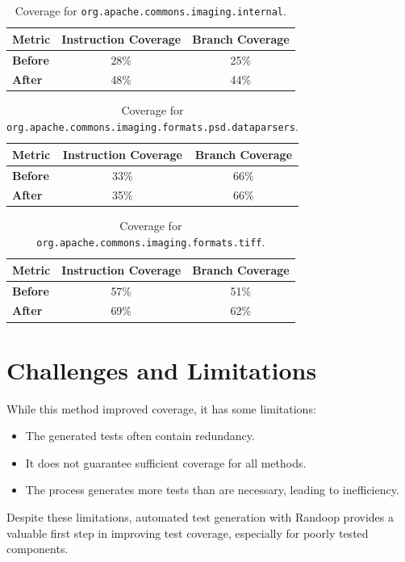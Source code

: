 \documentclass[a4paper,12pt]{report}
\begin{document}
\begin{table}[H]
    \centering
    \begin{tabular}{|l|c|c|}
        \hline
        \textbf{Metric} & \textbf{Instruction Coverage} & \textbf{Branch Coverage} \\ \hline
        \textbf{Before} & 28\% & 25\% \\ \hline
        \textbf{After}  & 48\% & 44\% \\ \hline
    \end{tabular}
    \caption{Coverage for \texttt{org.apache.commons.imaging.internal}.}
    \label{tab:coverage_internal}
\end{table}

\begin{table}[H]
    \centering
    \begin{tabular}{|l|c|c|}
        \hline
        \textbf{Metric} & \textbf{Instruction Coverage} & \textbf{Branch Coverage} \\ \hline
        \textbf{Before} & 33\% & 66\% \\ \hline
        \textbf{After}  & 35\% & 66\% \\ \hline
    \end{tabular}
    \caption{Coverage for \texttt{org.apache.commons.imaging.formats.psd.dataparsers}.}
    \label{tab:coverage_psd_dataparsers}
\end{table}

\begin{table}[H]
    \centering
    \begin{tabular}{|l|c|c|}
        \hline
        \textbf{Metric} & \textbf{Instruction Coverage} & \textbf{Branch Coverage} \\ \hline
        \textbf{Before} & 57\% & 51\% \\ \hline
        \textbf{After}  & 69\% & 62\% \\ \hline
    \end{tabular}
    \caption{Coverage for \texttt{org.apache.commons.imaging.formats.tiff}.}
    \label{tab:coverage_tiff}
\end{table}

\newpage
\section{Challenges and Limitations}
While this method improved coverage, it has some limitations:
\begin{itemize}
    \item The generated tests often contain redundancy.
    \item It does not guarantee sufficient coverage for all methods.
    \item The process generates more tests than are necessary, leading to inefficiency.
\end{itemize}
Despite these limitations, automated test generation with Randoop provides a valuable first step in improving test coverage, especially for poorly tested components.
\end{document}
